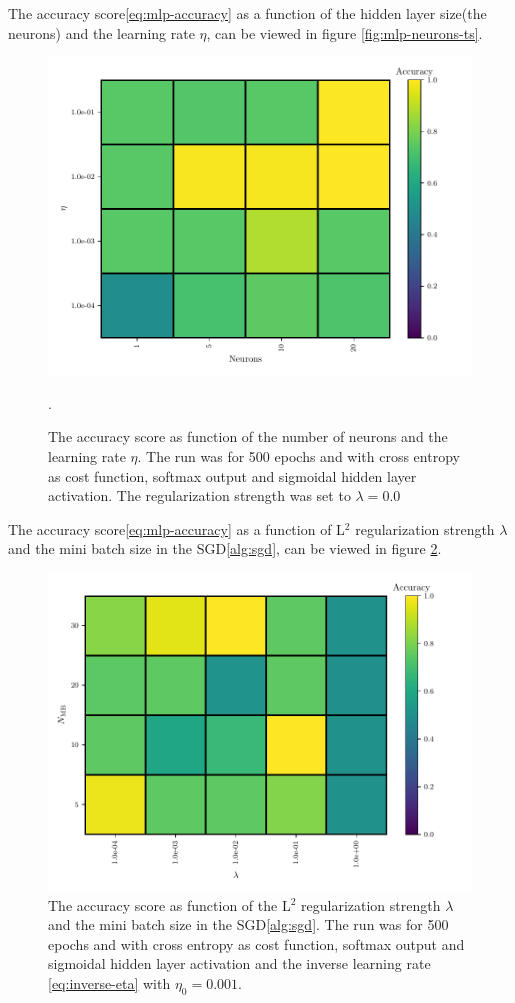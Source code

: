 The accuracy score\eqref{eq:mlp-accuracy} as a function of the hidden layer size(the neurons) and the learning rate $\eta$, can be viewed in figure \ref{fig:mlp-neurons-ts}.
\begin{figure}[H]
    \centering
    \includegraphics[scale=1.0]{../fig/mlp_neurons_eta.pdf}
    \caption{The accuracy score as function of the number of neurons and the learning rate $\eta$. The run was for 500 epochs and with cross entropy as cost function, softmax output and sigmoidal hidden layer activation. The regularization strength was set to $\lambda=0.0$}.
    \label{fig:mlp-neurons-eta}
\end{figure}

The accuracy score\eqref{eq:mlp-accuracy} as a function of L$^2$ regularization strength $\lambda$ and the mini batch size in the SGD\ref{alg:sgd}, can be viewed in figure \ref{fig:mlp-lambda-mb}.
\begin{figure}[H]
    \centering
    \includegraphics[scale=1.0]{../fig/mlp_lambda_mini_batch_size.pdf}
    \caption{The accuracy score as function of the  L$^2$ regularization strength $\lambda$ and the mini batch size in the SGD\ref{alg:sgd}. The run was for 500 epochs and with cross entropy as cost function, softmax output and sigmoidal hidden layer activation and the inverse learning rate \eqref{eq:inverse-eta} with $\eta_0=0.001$.}
    \label{fig:mlp-lambda-mb}
\end{figure}

